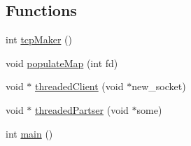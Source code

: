 \subsection*{Functions}
\begin{DoxyCompactItemize}
\item 
int \hyperlink{serverAndParcer_8c_09_09_a7cb86f6d733933107288b77527664613}{tcp\+Maker} ()
\item 
void \hyperlink{serverAndParcer_8c_09_09_a7410e9339d1139f46f6472c89222bb10}{populate\+Map} (int fd)
\item 
void $\ast$ \hyperlink{serverAndParcer_8c_09_09_a70874537694e95af79420af29ff34ae6}{threaded\+Client} (void $\ast$new\+\_\+socket)
\item 
void $\ast$ \hyperlink{serverAndParcer_8c_09_09_a51a231661435c593eb42172ed608fdb6}{threaded\+Partser} (void $\ast$some)
\item 
int \hyperlink{serverAndParcer_8c_09_09_ae66f6b31b5ad750f1fe042a706a4e3d4}{main} ()
\end{DoxyCompactItemize}
